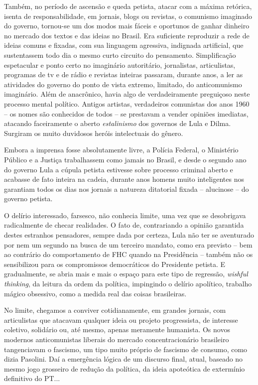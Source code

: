 Também, no período de ascensão e queda petista, atacar com a máxima
retórica, isenta de responsabilidade, em jornais, blogs ou revistas, o
comunismo imaginado do governo, tornou-se um dos modos mais fáceis e
oportunos de ganhar dinheiro no mercado dos textos e das ideias no
Brasil. Era suficiente reproduzir a rede de ideias comuns e fixadas, com
sua linguagem agressiva, indignada artificial, que sustentassem todo dia
o mesmo curto circuito do pensamento. Simplificação espetacular e ponto
certo no imaginário autoritário, jornalistas, articulistas, programas de
tv e de rádio e revistas inteiras passaram, durante anos, a ler as
atividades do governo do ponto de vista extremo, limitado, do
anticomunismo imaginário. Além de anacrônico, havia algo de
verdadeiramente preguiçoso neste processo mental político. Antigos
artistas, verdadeiros comunistas dos anos 1960 -- os nomes são
conhecidos de todos -- se prestavam a vender opiniões imediatas,
atacando faceiramente o aberto \emph{estalinismo} dos governos de Lula e
Dilma. Surgiram os muito duvidosos heróis intelectuais do gênero.

Embora a imprensa fosse absolutamente livre, a Polícia Federal, o
Ministério Público e a Justiça trabalhassem como jamais no Brasil, e
desde o segundo ano do governo Lula a cúpula petista estivesse sobre
processo criminal aberto e acabasse de fato inteira na cadeia, durante
anos homens muito inteligentes nos garantiam todos os dias nos jornais a
natureza ditatorial fixada -- alucinose -- do governo petista.

O delírio interessado, farsesco, não conhecia limite, uma vez que se
desobrigava radicalmente de checar realidades. O fato de, contrariando a
opinião garantida destes estranhos pensadores, sempre dada por certeza,
Lula não ter se aventurado por nem um segundo na busca de um terceiro
mandato, como era previsto -- bem ao contrário do comportamento de FHC
quando na Presidência -- também não os sensibilizou para os compromissos
democráticos do Presidente petista. E gradualmente, se abria mais e mais
o espaço para este tipo de regressão, \emph{wishful thinking}, da
leitura da ordem da política, impingindo o delírio apolítico, trabalho
mágico obsessivo, como a medida real das coisas brasileiras.

No limite, chegamos a conviver cotidianamente, em grandes jornais, com
articulistas que atacavam qualquer ideia ou projeto progressista, de
interesse coletivo, solidário ou, até mesmo, apenas meramente humanista.
Os novos modernos anticomunistas liberais do mercado concentracionário
brasileiro tangenciavam o fascismo, um tipo muito próprio de fascismo de
consumo, como dizia Pasolini. Daí a emergência lógica de um discurso
final, atual, baseado no mesmo jogo grosseiro de redução da política, da
ideia apoteótica de extermínio definitivo do PT...

